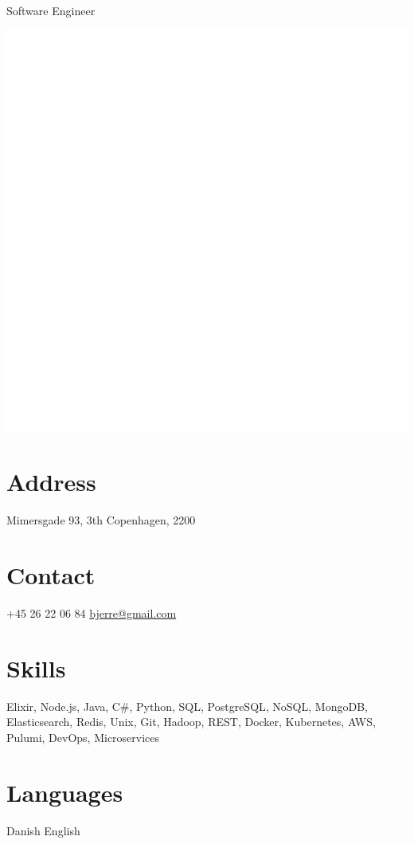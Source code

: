 \documentclass[]{friggeri-cv}
\begin{document}
      {Software Engineer}


\begin{aside}
  \includegraphics[scale=0.0382]{img/transparent.png}
  \section{Address}
    Mimersgade 93, 3th
    Copenhagen, 2200
    ~
  \section{Contact}
    +45 26 22 06 84
    \href{mailto:bjerre@gmail.com}{bjerre@gmail.com}
    ~
  \section{Skills}
    Elixir, Node.js, Java, C\#, Python, SQL, PostgreSQL, NoSQL, MongoDB, Elasticsearch, Redis, Unix, Git, Hadoop, REST, Docker, Kubernetes, AWS, Pulumi, DevOps, Microservices
    ~
  \section{Languages}
    Danish
    English
    ~
\end{aside}
~
\end{document}
